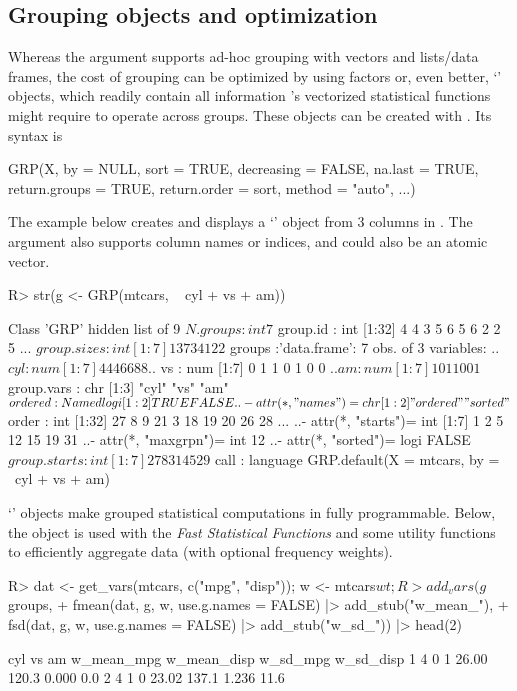 \documentclass[article]{jss}
\newcommand{\class}[1]{`\code{#1}'}
\begin{document}
\subsection{Grouping objects and optimization}
%
Whereas the  argument supports ad-hoc grouping with vectors and lists/data frames, the cost of grouping can be optimized by using factors or, even better, \class{GRP} objects, which readily contain all information 's vectorized statistical functions might require to operate across groups. These objects can be created with . Its syntax is
\begin{Code}
GRP(X, by = NULL, sort = TRUE, decreasing = FALSE, na.last = TRUE,
  return.groups = TRUE, return.order = sort, method = "auto", ...)
\end{Code}
 The example below creates and displays a \class{GRP} object from 3 columns in \href{https://www.rdocumentation.org/packages/datasets/versions/3.6.2/topics/mtcars}{}. The  argument also supports column names or indices, and  could also be an atomic vector.
%
\begin{Schunk}
\begin{Sinput}
R> str(g <- GRP(mtcars, ~ cyl + vs + am))
\end{Sinput}
\begin{Soutput}
Class 'GRP'  hidden list of 9
 $ N.groups    : int 7
 $ group.id    : int [1:32] 4 4 3 5 6 5 6 2 2 5 ...
 $ group.sizes : int [1:7] 1 3 7 3 4 12 2
 $ groups      :'data.frame':	7 obs. of  3 variables:
  ..$ cyl: num [1:7] 4 4 4 6 6 8 8
  ..$ vs : num [1:7] 0 1 1 0 1 0 0
  ..$ am : num [1:7] 1 0 1 1 0 0 1
 $ group.vars  : chr [1:3] "cyl" "vs" "am"
 $ ordered     : Named logi [1:2] TRUE FALSE
  ..- attr(*, "names")= chr [1:2] "ordered" "sorted"
 $ order       : int [1:32] 27 8 9 21 3 18 19 20 26 28 ...
  ..- attr(*, "starts")= int [1:7] 1 2 5 12 15 19 31
  ..- attr(*, "maxgrpn")= int 12
  ..- attr(*, "sorted")= logi FALSE
 $ group.starts: int [1:7] 27 8 3 1 4 5 29
 $ call        : language GRP.default(X = mtcars, by = ~cyl + vs + am)
\end{Soutput}
\end{Schunk}
%
\class{GRP} objects make grouped statistical computations in  fully programmable. Below, the object is used with the \emph{Fast Statistical Functions} and some utility functions to efficiently aggregate data (with optional frequency weights).
%
\begin{Schunk}
\begin{Sinput}
R> dat <- get_vars(mtcars, c("mpg", "disp")); w <- mtcars$wt;
R> add_vars(g$groups,
+    fmean(dat, g, w, use.g.names = FALSE) |> add_stub("w_mean_"),
+    fsd(dat, g, w, use.g.names = FALSE) |> add_stub("w_sd_")) |> head(2)
\end{Sinput}
\begin{Soutput}
  cyl vs am w_mean_mpg w_mean_disp w_sd_mpg w_sd_disp
1   4  0  1      26.00       120.3    0.000       0.0
2   4  1  0      23.02       137.1    1.236      11.6
\end{Soutput}
\end{Schunk}
\end{document}
